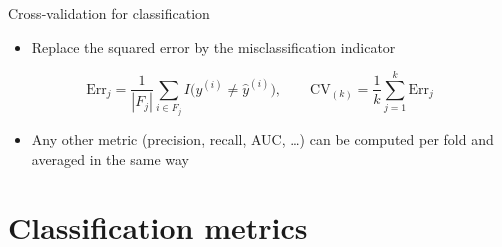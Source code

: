 \begin{frame}{Cross-validation for classification}
    \begin{itemize}
        \item Replace the squared error by the misclassification indicator
    \end{itemize}
    \[
        \mathrm{Err}_j = \frac{1}{|F_j|}\sum_{i\in F_j} I\big(y^{(i)} \neq \hat{y}^{(i)}\big),
        \qquad
        \mathrm{CV}_{(k)} = \frac{1}{k}\sum_{j=1}^{k}\mathrm{Err}_j
    \]
    \begin{itemize}
        \item Any other metric (precision, recall, AUC, \dots) can be computed per fold and averaged in the same way
    \end{itemize}
\end{frame}


\section{Classification metrics}


